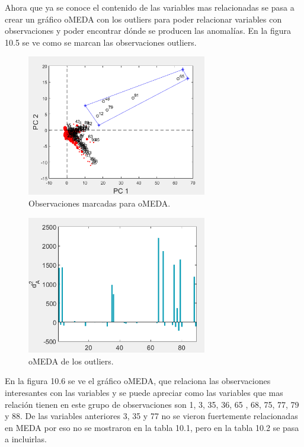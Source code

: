 \bigskip

Ahora que ya se conoce el contenido de las variables mas relacionadas se pasa a crear un gráfico oMEDA con los outliers para poder relacionar variables con observaciones y poder encontrar dónde se producen las anomalías. En la figura 10.5 se ve como se marcan las observaciones outliers.

\begin{figure}
\centering
\includegraphics[width=0.7\textwidth]{imagenes/casoEstudio/10_5.png}
\caption{Observaciones marcadas para oMEDA.}
\end{figure}

\begin{figure}[H]
\centering
\includegraphics[width=0.7\textwidth]{imagenes/casoEstudio/10_6.png}
\caption{oMEDA de los outliers.}
\end{figure}

\bigskip

En la figura 10.6 se ve el gráfico oMEDA, que relaciona las observaciones interesantes con las variables y se puede apreciar como las variables que mas relación tienen en este grupo de observaciones son 1, 3, 35, 36, 65 , 68, 75, 77, 79 y 88. De las variables anteriores 3, 35 y 77 no se vieron fuertemente relacionadas en MEDA por eso no se mostraron en la tabla 10.1, pero en la tabla 10.2 se pasa a incluirlas.

